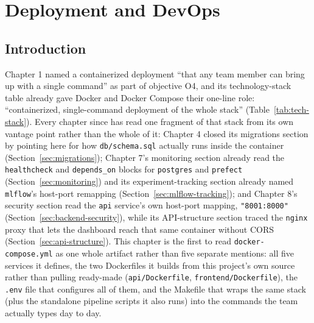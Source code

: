 \chapter{Deployment and DevOps}

\section{Introduction}
\label{sec:deploy-intro}
\begin{sloppypar}
Chapter 1 named a containerized deployment ``that any team member can bring up with a single command'' as part of objective O4, and its technology-stack table already gave Docker and Docker Compose their one-line role: ``containerized, single-command deployment of the whole stack'' (Table~\ref{tab:tech-stack}). Every chapter since has read one fragment of that stack from its own vantage point rather than the whole of it: Chapter 4 closed its migrations section by pointing here for how \texttt{db/\allowbreak schema.sql} actually runs inside the container (Section~\ref{sec:migrations}); Chapter 7's monitoring section already read the \texttt{healthcheck} and \texttt{depends\_on} blocks for \texttt{postgres} and \texttt{prefect} (Section~\ref{sec:monitoring}) and its experiment-tracking section already named \texttt{mlflow}'s host-port remapping (Section~\ref{sec:mlflow-tracking}); and Chapter 8's security section read the \texttt{api} service's own host-port mapping, \texttt{"8001:8000"} (Section~\ref{sec:backend-security}), while its API-structure section traced the \texttt{nginx} proxy that lets the dashboard reach that same container without CORS (Section~\ref{sec:api-structure}). This chapter is the first to read \texttt{docker-compose.yml} as one whole artifact rather than five separate mentions: all five services it defines, the two Dockerfiles it builds from this project's own source rather than pulling ready-made (\texttt{api/\allowbreak Dockerfile}, \texttt{frontend/\allowbreak Dockerfile}), the \texttt{.env} file that configures all of them, and the Makefile that wraps the same stack (plus the standalone pipeline scripts it also runs) into the commands the team actually types day to day.
\end{sloppypar}

